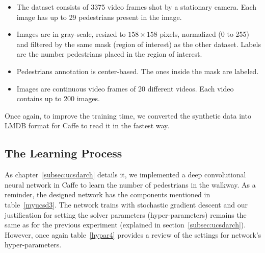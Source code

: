 \begin{itemize}
\item The dataset consists of 3375 video frames shot by a stationary camera. Each image has up to 29 pedestrians present in the image.
\item Images are in gray-scale, resized to $158\times158$ pixels, normalized (0 to 255) and filtered by the same mask (region of interest) as the other dataset. Labels are the number pedestrians placed in the region of interest.
\item Pedestrians annotation is center-based. The ones inside the mask are labeled.  
\item Images are continuous video frames of 20 different videos. Each video contains up to 200 images.  
\end{itemize}

Once again, to improve the training time, we converted the synthetic data into LMDB format for Caffe to read it in the fastest way.


\subsection{The Learning Process}

As chapter~\ref{subsec:ucsdarch} details it, we implemented a deep convolutional neural network in Caffe to learn the number of pedestrians in the walkway. As a reminder, the designed network has the components mentioned in table~\ref{myucsd3}. The network trains with stochastic gradient descent and our justification for setting the solver parameters (hyper-parameters) remains the same as for the previous experiment (explained in section~\ref{subsec:ucsdarch}). However, once again table~\ref{hypar4} provides a review of the settings for network's hyper-parameters.

